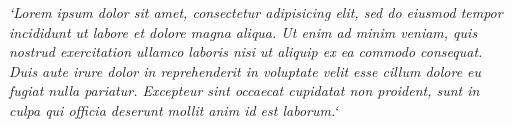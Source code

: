 \begin{epigrafe}
    \vspace*{\fill}
	\begin{flushright}
		\textit{`Lorem ipsum dolor sit amet, consectetur adipisicing elit, sed do eiusmod tempor incididunt ut labore et dolore magna aliqua. Ut enim ad minim veniam, quis nostrud exercitation ullamco laboris nisi ut aliquip ex ea commodo consequat. Duis aute irure dolor in reprehenderit in voluptate velit esse cillum dolore eu fugiat nulla pariatur. Excepteur sint occaecat cupidatat non proident, sunt in culpa qui officia deserunt mollit anim id est laborum.`}
	\end{flushright}
\end{epigrafe}
